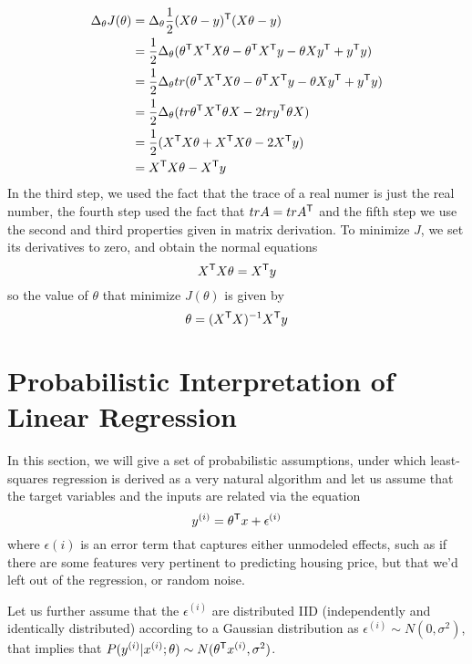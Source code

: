 \begin{align*}
    \Delta _{\theta} J(\theta) & = \Delta _{\theta} \frac{1}{2} (X \theta - y) ^ \mathsf{T} (X \theta - y) \\
                               & = \frac{1}{2} \Delta _{\theta} (\theta ^ \mathsf{T} X ^ \mathsf{T} X \theta -
                                   \theta ^ \mathsf{T} X ^ \mathsf{T} y - \theta X y ^ \mathsf{T} + y ^ \mathsf{T} y) \\
                               & = \frac{1}{2} \Delta _{\theta} tr(\theta ^ \mathsf{T} X ^ \mathsf{T} X \theta -
                                   \theta ^ \mathsf{T} X ^ \mathsf{T} y - \theta X y ^ \mathsf{T} + y ^ \mathsf{T} y) \\
                               & = \frac{1}{2} \Delta _{\theta} (tr \theta ^ \mathsf{T} X ^ \mathsf{T} \theta X -
                                   2 tr y ^ \mathsf{T} \theta X) \\
                               & = \frac{1}{2} (X ^ \mathsf{T} X \theta + X ^ \mathsf{T} X \theta - 2 X ^ \mathsf{T} y) \\
                               & = X ^ \mathsf{T} X \theta - X ^ \mathsf{T} y 
\end{align*}
In the third step, we used the fact that the trace of a real numer is just the real number, the fourth step 
used the fact that $tr A = tr A ^ \mathsf{T}$ and the fifth step we use the second and third properties given 
in matrix derivation.\newline
To minimize $J$, we set its derivatives to zero, and obtain the normal equations
\[ X ^ \mathsf{T} X \theta = X ^ \mathsf{T} y \]
so the value of $\theta$ that minimize $J(\theta)$ is given by 
\[ \theta = (X ^ \mathsf{T} X)^{-1} X ^ \mathsf{T} y \]


\section{Probabilistic Interpretation of Linear Regression}
In this section, we will give a set of probabilistic assumptions, under which least-squares regression
is derived as a very natural algorithm and let us assume that the target variables and the inputs 
are related via the equation
\[ y^{(i)} = \theta ^ \mathsf{T} x + \epsilon ^{(i)} \]
where $\epsilon{(i)}$ is an error term that captures either unmodeled effects, such as if there are some features
very pertinent to predicting housing price, but that we’d left out of the regression, or random noise.

Let us further assume that the $\epsilon^{(i)}$ are distributed IID (independently and identically distributed)
according to a Gaussian distribution as $\epsilon^{(i)} \sim N(0, \sigma^2)$, that implies that 
$P(y^{(i)} | x^{(i)} ; \theta) \sim N(\theta ^ \mathsf{T}x^{(i)}, \sigma^2)$.


